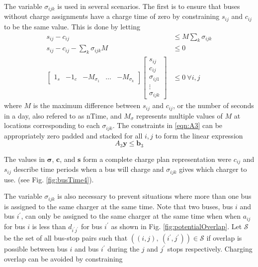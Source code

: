 	The variable $\sigma_{ijk}$ is used in several scenarios. The first is to ensure that buses without charge assignments have a charge time of zero by constraining $s_{ij}$ and $c_{ij}$ to be the same value. This is done by letting
	\begin{equation}\label{eqn:A3}\begin{aligned}
	s_{ij} - c_{ij} &\le M\sum_{k}\sigma_{ijk} \\
	s_{ij} - c_{ij} - \sum_{k}\sigma_{ijk}M &\le 0\\
		\begin{bmatrix} 1_s & -1_c & -M_{\sigma_1} & \hdots & -M_{\sigma_k} \end{bmatrix}\begin{bmatrix}s_{ij} \\ c_{ij} \\ \sigma_{ij1} \\ \vdots \\ \sigma_{ijk} \end{bmatrix} &\le 0 \ \forall i,j 
\end{aligned} \end{equation}
	where $M$ is the maximum difference between $s_{ij}$ and $c_{ij}$, or the number of seconds in a day, also refered to as $\text{nTime}$, and $M_\sigma$ represents multiple values of $M$ at locations corresponding to each $\sigma_{ijk}$. The constraints in \eqref{eqn:A3} can be appropriately zero padded and stacked for all $i,j$ to form the linear expression
	\begin{equation} 
		A_3\mathbf{y} \le \mathbf{b}_3
	\end{equation}
	\par The values in $\boldsymbol{\sigma}$, $\mathbf{c}$, and $\mathbf{s}$ form a complete charge plan representation were $c_{ij}$ and $s_{ij}$ describe time periods when a bus will charge and $\sigma_{ijk}$ gives which charger to use. (see Fig. \ref{fig:busTime4}).

	The variable $\sigma_{ijk}$ is also necessary to prevent situations where more than one bus is assigned to the same charger at the same time. Note that two buses, bus $i$ and bus $i^{'}$, can only be assigned to the same charger at the same time when when $a_{ij}$ for bus $i$ is less than $d_{i^{'}j^{'}}$ for bus $i^{'}$ as shown in Fig. \ref{fig:potentialOverlap}. Let $\mathcal{S}$ be the set of all bus-stop pairs such that $\left ((i,j), \ (i^{'},j^{'}) \right ) \in \mathcal{S}$ if overlap is possible between bus $i$ and bus $i^{'}$ during the $j$ and $j^{'}$ stops respectively. Charging overlap can be avoided by constraining


